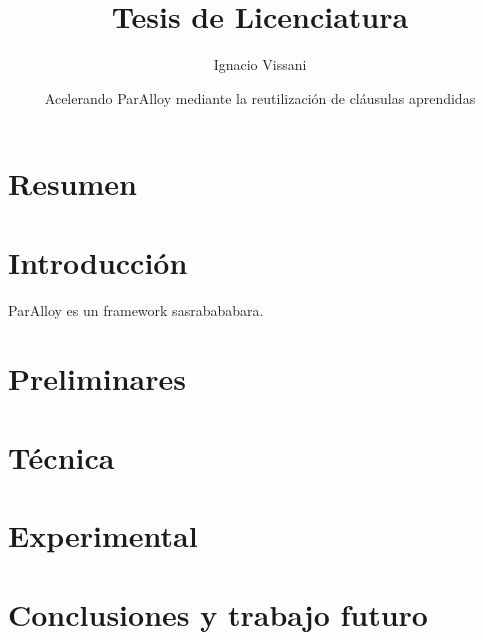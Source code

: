 \documentclass[a4paper, 11pt]{book}
\begin{document}
\author{Ignacio Vissani}
\title{Tesis de Licenciatura}
\date{Acelerando ParAlloy mediante la reutilización de cláusulas aprendidas}

\maketitle
\tableofcontents

\chapter{Resumen}
\chapter{Introducción}
ParAlloy \cite{rosner:abz10} es un framework sasrabababara.

\chapter{Preliminares}
\chapter{Técnica}
\chapter{Experimental}
\chapter{Conclusiones y trabajo futuro}

{}

\end{document}

